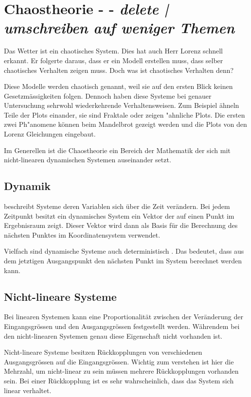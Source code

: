 
\section{Chaostheorie - - \textit{delete | umschreiben auf weniger Themen}}
Das Wetter ist ein chaotisches System. Dies hat auch Herr Lorenz schnell erkannt. Er folgerte daraus, dass er ein Modell erstellen muss, dass selber chaotisches Verhalten zeigen muss. Doch was ist chaotisches Verhalten denn?

Diese Modelle werden chaotisch genannt, weil sie auf den ersten Blick keinen Gesetzmässigkeiten folgen. Dennoch haben diese Systeme bei genauer Untersuchung sehrwohl wiederkehrende Verhaltensweisen. Zum Beispiel ähneln Teile der Plots einander, sie sind Fraktale oder zeigen "ahnliche Plots. Die ersten zwei Ph"anomene können beim Mandelbrot gezeigt werden \cite{Gleick} und die Plots von den Lorenz Gleichungen eingebaut.

Im Generellen ist die Chaostheorie ein Bereich der Mathematik der sich mit nicht-linearen dynamischen Systemen auseinander setzt.

\subsection{Dynamik} beschreibt Systeme deren Variablen sich über die Zeit verändern. Bei jedem Zeitpunkt besitzt ein dynamisches System ein Vektor der auf einen Punkt im Ergebnisraum zeigt. Dieser Vektor wird dann als Basis für die Berechnung des nächsten Punktes im Koordinatensystem verwendet.

Vielfach sind dynamische Systeme auch deterministisch \cite{wikidynamicalsystems}. Das bedeutet, dass aus dem jetztigen Ausgangspunkt den nächsten Punkt im System berechnet werden kann.


\subsection{Nicht-lineare Systeme} %
Bei linearen Systemen kann eine Proportionalität zwischen der Veränderung der Eingangsgrössen und den Ausgangsgrössen festgestellt werden. Währendem bei den nicht-linearen Systemen genau diese Eigenschaft nicht vorhanden ist.

Nicht-lineare Systeme besitzen Rückkopplungen von verschiedenen Ausgangsgrössen auf die Eingangsgrössen. Wichtig zum verstehen ist hier die Mehrzahl, um nicht-linear zu sein müssen mehrere Rückkopplungen vorhanden sein. Bei einer Rückkopplung ist es sehr wahrscheinlich, dass das System sich linear verhaltet.

